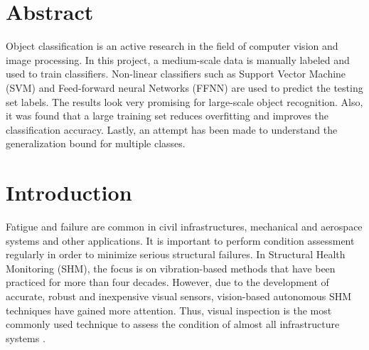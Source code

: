 \documentclass[letterpaper,12pt, onecolumn]{article}%
\begin{document}
    \thisfancypage{%
    \setlength{\fboxsep}{4pt}%
    \setlength{\shadowsize}{0pt}%
    \shadowbox}{}
  


\cleardoublepage{}
\renewcommand{\contentsname}{Table of Contents}
\tableofcontents


%
\cleardoublepage{}
\listoftables

%
\cleardoublepage{}
\listoffigures

\cleardoublepage{}
\section*{Abstract}
\noindent
Object classification is an active research in the field of computer vision and image processing. In this project, a medium-scale data is manually labeled and used to train classifiers. Non-linear classifiers such as Support Vector Machine (SVM) and Feed-forward neural Networks (FFNN) are used to predict the testing set labels. The results look very promising for large-scale object recognition. Also, it was found that a large training set reduces overfitting and improves the classification accuracy. Lastly, an attempt has been made to understand the generalization bound for multiple classes. 

\clearpage
{}	
\setcounter{page}{1}



\section{Introduction}
\noindent
Fatigue and failure are common in civil infrastructures, mechanical and aerospace systems and other applications. It is important to perform condition assessment regularly in order to minimize serious structural failures. In Structural Health Monitoring (SHM), the focus is on vibration-based methods that have been practiced for more than four decades. However, due to the development of accurate, robust and inexpensive visual sensors, vision-based autonomous SHM techniques have gained more attention. Thus, visual inspection is the most commonly used technique to assess the condition of almost all infrastructure systems \citep{jahanshahi2011multi-image}.
\end{document}
